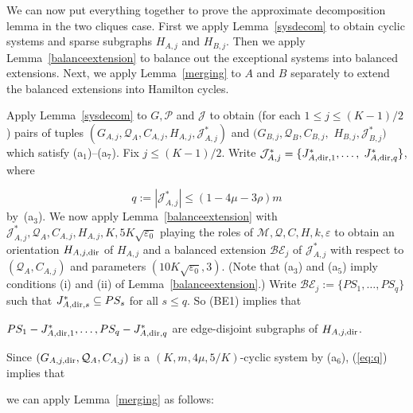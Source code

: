 \documentclass{memo-l}
\def\COMMENT#1{}
\def\eps{\varepsilon}
\numberwithin{section}{chapter}
\numberwithin{equation}{section}
\numberwithin{firstthm}{section}
\numberwithin{figure}{section}
\begin{document}
{We can now put everything together to prove the approximate decomposition lemma in the two cliques case.
First we apply Lemma~\ref{sysdecom} to obtain cyclic systems and sparse subgraphs $H_{A,j}$ and $H_{B,j}$.
Then we apply Lemma~\ref{balanceextension} to balance out the exceptional systems into balanced extensions.
Next, we apply Lemma~\ref{merging} to $A$ and $B$ separately to extend the balanced extensions into Hamilton cycles.%
    \COMMENT{Deryk: added blabla}

\removelastskip{}\medskip{}
Apply Lemma~\ref{sysdecom} to $G, \mathcal{P}$ and $\mathcal{J}$ to obtain  (for each $1 \le j \le (K-1)/2$)  pairs of 
tuples $(G_{A,j}, \mathcal{Q}_{A}, C_{A,j}, H_{A,j}, \mathcal{J}^*_{A,j})$ and $(G_{B,j}, \mathcal{Q}_{B}, C_{B,j},$ $ H_{B,j}, \mathcal{J}^*_{B,j})$
which satisfy (a$_1$)--(a$_7$).
Fix $j \le (K-1)/2$. Write $\mathcal{J}^*_{A,j} = \{J^*_{A, {\rm dir},1}, \dots, $ $J^*_{A, {\rm dir},q}\}$, where%
    \COMMENT{Deryk: defined $q$ and used it below}
\begin{equation}\label{eq:q}
q:=|\mathcal{J}^*_{A,j}|\le (1-4\mu-3\rho)m
\end{equation}
by~(a$_3$).
We now apply Lemma~\ref{balanceextension} with $\mathcal{J}^*_{A,j},\mathcal{Q}_A,C_{A,j}, H_{A,j}, K, 5K \sqrt{\eps_{0}}$ playing
the roles of $\mathcal{M}, \mathcal{Q}, C, H, k,\eps$ to obtain an orientation $H_{A,j,{\rm dir}}$ of $H_{A,j}$ and
a balanced extension $\mathcal{BE}_j$ of $\mathcal{J}^*_{A,j}$ with respect to $(\mathcal{Q}_A, C_{A,j})$ and parameters $(10K \sqrt{\eps_{0}},3)$.
(Note that (a$_3$) and (a$_5$) imply conditions (i) and (ii) of Lemma~\ref{balanceextension}.)
Write $\mathcal{BE}_j :=  \{PS_{1}, \dots, PS_q \}$ such that $J^*_{A, {\rm dir},s} \subseteq PS_s$ for all $s \le q$.
So (BE1) implies that%
   \COMMENT{Daniela: reworded}
$PS_{1} - J^*_{A, {\rm dir},1}, \dots, PS_q - J^*_{A, {\rm dir}, q}$ are edge-disjoint subgraphs of $H_{A,j,{\rm dir}}$.%
	\COMMENT{Allan:added more explanations}
Since $(G_{A,j, {\rm dir}}, \mathcal{Q}_{A}, C_{A,j})$ is a $(K,m, 4 \mu, 5/K)$-cyclic system by (a$_6$), (\ref{eq:q}) implies that%
    \COMMENT{Deryk: added ref to (\ref{eq:q})}
we can apply Lemma~\ref{merging} as follows:
\smallskip
\begin{center}
  \begin{tabular}{ r | c | c | c | c | c | c | c | c | c | c |c}


\end{tabular}
\end{center}}
\end{document}
